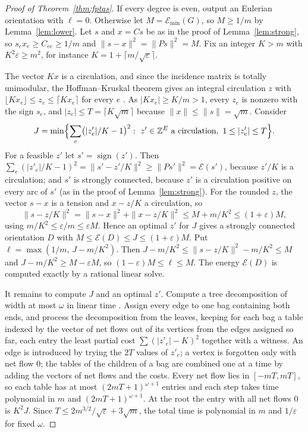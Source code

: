 \documentclass[11pt]{amsart}
\theoremstyle{definition}
\theoremstyle{remark}
\numberwithin{equation}{section}
\newcommand{\Emin}{\mathcal E_{\min}}
\newcommand{\Z}{\mathbb Z}
\begin{document}
\begin{proof}[Proof of Theorem~\ref{thm:fptas}]
If every degree is even, output an Eulerian orientation with $\ell=0$. Otherwise let $M=\Emin(G)$, so $M\ge1/m$ by Lemma~\ref{lem:lower}. Let $s$ and $x=Cs$ be as in the proof of Lemma~\ref{lem:strong}, so $s_ex_e\ge C_{ee}\ge1/m$ and $\|s-x\|^2=\|Ps\|^2=M$. Fix an integer $K>m$ with $K^2\varepsilon\ge m^2$, for instance $K=1+\lceil m/\sqrt\varepsilon\rceil$.

The vector $Kx$ is a circulation, and since the incidence matrix is totally unimodular, the Hoffman--Kruskal theorem gives an integral circulation $z$ with $\lfloor Kx_e\rfloor\le z_e\le\lceil Kx_e\rceil$ for every $e$ \cite[Chapter~19]{Schrijver}. As $|Kx_e|\ge K/m>1$, every $z_e$ is nonzero with the sign $s_e$, and $|z_e|\le T=\lceil K\sqrt m\rceil$ because $\|x\|\le\|s\|=\sqrt m$. Consider
\[
J=\min\Bigl\{\sum_e\bigl(|z'_e|/K-1\bigr)^2:\ z'\in\Z^E\ \text{a circulation},\ 1\le|z'_e|\le T\Bigr\}.
\]
For a feasible $z'$ let $s'=\operatorname{sign}(z')$. Then $\sum_e(|z'_e|/K-1)^2=\|s'-z'/K\|^2\ge\|Ps'\|^2=\mathcal E(s')$, because $z'/K$ is a circulation; and $s'$ is strongly connected, because $z'$ is a circulation positive on every arc of $s'$ (as in the proof of Lemma~\ref{lem:strong}). For the rounded $z$, the vector $s-x$ is a tension and $x-z/K$ a circulation, so
\[
\|s-z/K\|^2=\|s-x\|^2+\|x-z/K\|^2\le M+m/K^2\le(1+\varepsilon)M,
\]
using $m/K^2\le\varepsilon/m\le\varepsilon M$. Hence an optimal $z'$ for $J$ gives a strongly connected orientation $D$ with $M\le \mathcal E(D)\le J\le(1+\varepsilon)M$. Put $\ell=\max(1/m,\,J-m/K^2)$. Then $J-m/K^2\le\|s-z/K\|^2-m/K^2\le M$ and $J-m/K^2\ge M-\varepsilon M$, so $(1-\varepsilon)M\le\ell\le M$. The energy $\mathcal E(D)$ is computed exactly by a rational linear solve.

It remains to compute $J$ and an optimal $z'$. Compute a tree decomposition of width at most $\omega$ in linear time \cite{Bodlaender96}. Assign every edge to one bag containing both ends, and process the decomposition from the leaves, keeping for each bag a table indexed by the vector of net flows out of its vertices from the edges assigned so far, each entry the least partial cost $\sum(|z'_e|-K)^2$ together with a witness. An edge is introduced by trying the $2T$ values of $z'_e$; a vertex is forgotten only with net flow $0$; the tables of the children of a bag are combined one at a time by adding the vectors of net flows and the costs. Every net flow lies in $[-mT,mT]$, so each table has at most $(2mT+1)^{\omega+1}$ entries and each step takes time polynomial in $m$ and $(2mT+1)^{\omega+1}$. At the root the entry with all net flows $0$ is $K^2J$. Since $T\le 2m^{3/2}/\sqrt\varepsilon+3\sqrt m$, the total time is polynomial in $m$ and $1/\varepsilon$ for fixed $\omega$.
\end{proof}
\end{document}
